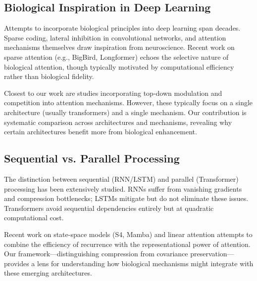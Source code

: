 \subsection{Biological Inspiration in Deep Learning}

Attempts to incorporate biological principles into deep learning span decades. Sparse coding, lateral inhibition in convolutional networks, and attention mechanisms themselves draw inspiration from neuroscience. Recent work on sparse attention (e.g., BigBird, Longformer) echoes the selective nature of biological attention, though typically motivated by computational efficiency rather than biological fidelity.

Closest to our work are studies incorporating top-down modulation and competition into attention mechanisms. However, these typically focus on a single architecture (usually transformers) and a single mechanism. Our contribution is systematic comparison across architectures and mechanisms, revealing why certain architectures benefit more from biological enhancement.

\subsection{Sequential vs. Parallel Processing}

The distinction between sequential (RNN/LSTM) and parallel (Transformer) processing has been extensively studied. RNNs suffer from vanishing gradients and compression bottlenecks; LSTMs mitigate but do not eliminate these issues. Transformers avoid sequential dependencies entirely but at quadratic computational cost.

Recent work on state-space models (S4, Mamba) and linear attention attempts to combine the efficiency of recurrence with the representational power of attention. Our framework---distinguishing compression from covariance preservation---provides a lens for understanding how biological mechanisms might integrate with these emerging architectures.
